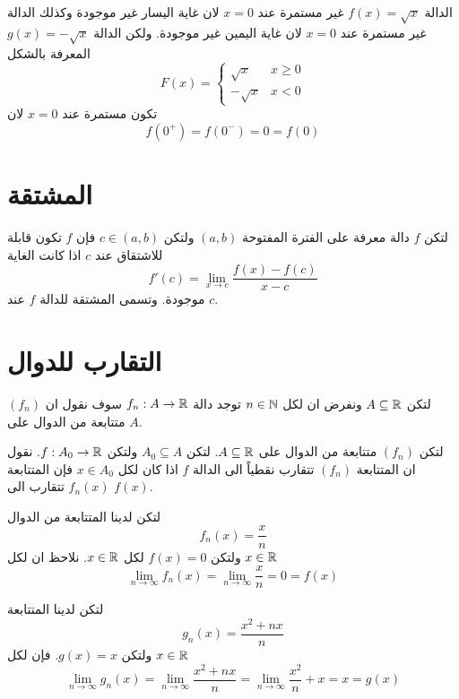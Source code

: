 \begin{example}
الدالة $f(x) = \sqrt{x}$ غير مستمرة عند $x=0$ لان غاية اليسار غير موجودة وكذلك الدالة \\$ g(x) =- \sqrt{x}$ غير مستمرة عند $x=0$ لان غاية اليمين غير موجودة. ولكن الدالة المعرفة بالشكل
\[
F(x) = \begin{cases}
	\sqrt{x} & x\geq0 \\
	-\sqrt{x} & x < 0
\end{cases}
\]
تكون مستمرة عند $x=0$ لان
\[
f(0^+) = f(0^-) = 0 = f(0)
\]

\begin{figure}[H]
	\centering
\end{figure}
\end{example}
\newpage
\section{المشتقة \cite{realanal}}
\begin{definition}
	لتكن $f$ دالة معرفة على الفترة المفتوحة $(a, b)$ ولتكن $c\in (a, b)$ فإن $f$ تكون قابلة للاشتقاق عند $c$ اذا كانت الغاية
	\[
	f'(c) = \lim\limits_{x\to c} \frac{f(x) - f(c)}{x-c} 
	\]
	موجودة. وتسمى المشتقة للدالة $f$ عند $c$.
\end{definition}


\section{التقارب للدوال \cite{elemrealanal}} 
لتكن $A\subseteq\mathbb{R}$ ونفرض ان لكل $n\in\mathbb{N}$ توجد دالة $f_n:A\to\mathbb{R}$ سوف نقول ان $(f_n)$ متتابعة من الدوال على $A$.
\begin{definition}
 	لتكن $(f_n)$ متتابعة من الدوال على $A\subseteq\mathbb{R}$. لتكن $A_0\subseteq A$ ولتكن $f:A_0\to\mathbb{R}$. نقول ان المتتابعة $(f_n)$ تتقارب نقطياً الى الدالة $f$ اذا كان لكل $x\in A_0 $ فإن المتتابعة $f_n(x)$ تتقارب الى $f(x)$.
\end{definition}

\begin{example}
	 لتكن لدينا المتتابعة من الدوال
	\[
	f_n(x) = \frac{x}{n}
	\]
	ولتكن $f(x) = 0$ لكل $x\in \mathbb{R}$. نلاحظ ان لكل $x\in \mathbb{R}$
	\[
	\lim\limits_{n\to \infty}f_n(x)  = \lim\limits_{n\to \infty}\frac{x}{n} = 0 = f(x)
	\]
	\end{example}
\begin{example}
لتكن لدينا المتتابعة 
	\[
	g_n(x) = \frac{x^2 + nx}{n}
	\]
	ولتكن $g(x) = x$. فإن لكل $x\in\mathbb{R}$
	\[
	\lim\limits_{n\to \infty}g_n(x)  = \lim\limits_{n\to \infty}\frac{x^2+nx}{n} = \lim\limits_{n\to \infty}\frac{x^2}{n} + x = x = g(x)
	\]
\end{example}

